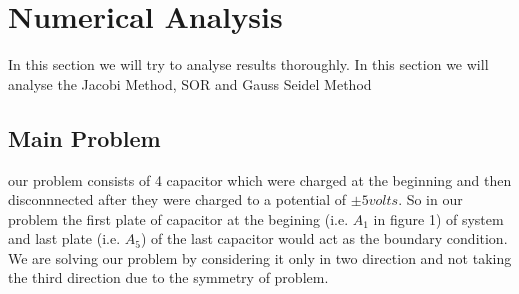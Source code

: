 \section{Numerical Analysis}
In this section we will try to analyse  results thoroughly. In this section we will analyse the Jacobi Method, SOR  and Gauss Seidel Method  
\subsection{Main Problem}
our problem consists of 4 capacitor which were charged at the beginning and then disconnnected after they were charged  to a potential of $ \pm5 volts$. So in our problem the first plate of capacitor at the begining {(i.e. $A_{1}$ in figure 1) }of system and last plate {(i.e. $A_5$)} of the last capacitor  would act as the boundary condition. We are solving our problem by considering it only in two direction and not taking the third direction due to the symmetry of problem.
